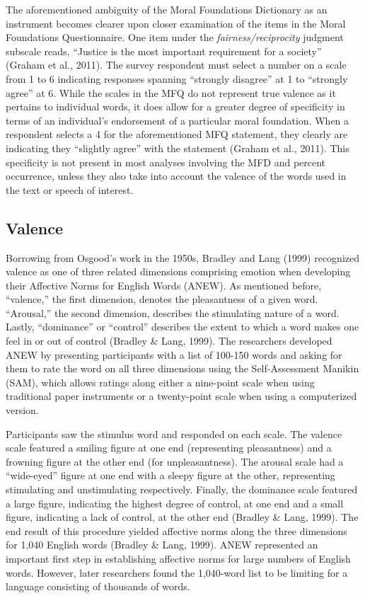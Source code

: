 \documentclass[english,,man]{apa6}
\begin{document}
The aforementioned ambiguity of the Moral Foundations Dictionary as an instrument becomes clearer upon closer examination of the items in the Moral Foundations Questionnaire. One item under the \emph{fairness/reciprocity} judgment subscale reads, \enquote{Justice is the most important requirement for a society} (Graham et al., 2011). The survey respondent must select a number on a scale from 1 to 6 indicating responses spanning \enquote{strongly disagree} at 1 to \enquote{strongly agree} at 6. While the scales in the MFQ do not represent true valence as it pertains to individual words, it does allow for a greater degree of specificity in terms of an individual's endorsement of a particular moral foundation. When a respondent selects a 4 for the aforementioned MFQ statement, they clearly are indicating they \enquote{slightly agree} with the statement (Graham et al., 2011). This specificity is not present in most analyses involving the MFD and percent occurrence, unless they also take into account the valence of the words used in the text or speech of interest.

\hypertarget{valence}{%
\subsection{Valence}\label{valence}}

Borrowing from Osgood's work in the 1950s, Bradley and Lang (1999) recognized valence as one of three related dimensions comprising emotion when developing their Affective Norms for English Words (ANEW). As mentioned before, \enquote{valence,} the first dimension, denotes the pleasantness of a given word. \enquote{Arousal,} the second dimension, describes the stimulating nature of a word. Lastly, \enquote{dominance} or \enquote{control} describes the extent to which a word makes one feel in or out of control (Bradley \& Lang, 1999). The researchers developed ANEW by presenting participants with a list of 100-150 words and asking for them to rate the word on all three dimensions using the Self-Assessment Manikin (SAM), which allows ratings along either a nine-point scale when using traditional paper instruments or a twenty-point scale when using a computerized version.

Participants saw the stimulus word and responded on each scale. The valence scale featured a smiling figure at one end (representing pleasantness) and a frowning figure at the other end (for unpleasantness). The arousal scale had a \enquote{wide-eyed} figure at one end with a sleepy figure at the other, representing stimulating and unstimulating respectively. Finally, the dominance scale featured a large figure, indicating the highest degree of control, at one end and a small figure, indicating a lack of control, at the other end (Bradley \& Lang, 1999). The end result of this procedure yielded affective norms along the three dimensions for 1,040 English words (Bradley \& Lang, 1999). ANEW represented an important first step in establishing affective norms for large numbers of English words. However, later researchers found the 1,040-word list to be limiting for a language consisting of thousands of words.
\end{document}
